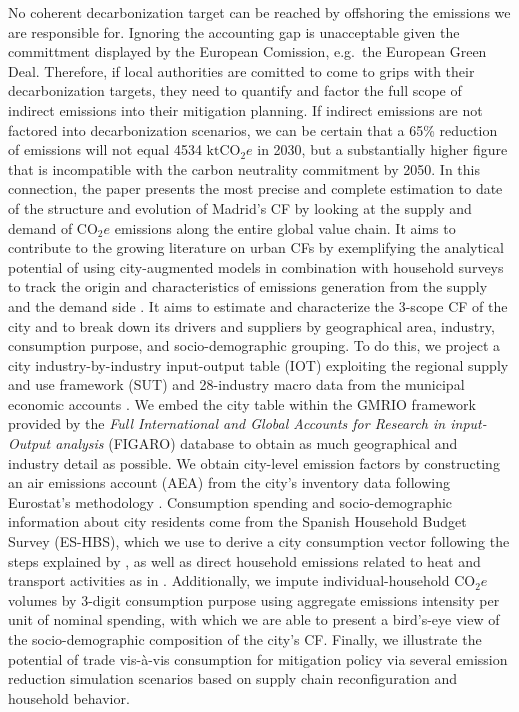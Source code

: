 \documentclass[
  10pt,
  twocolumn]{aft}
\begin{document}
No coherent decarbonization target can be reached by offshoring the
emissions we are responsible for. Ignoring the accounting gap is
unacceptable given the committment displayed by the European Comission,
e.g.~the European Green Deal. Therefore, if local authorities are
comitted to come to grips with their decarbonization targets, they need
to quantify and factor the full scope of indirect emissions into their
mitigation planning. If indirect emissions are not factored into
decarbonization scenarios, we can be certain that a 65\% reduction of
emissions will not equal 4534 \(\text{ktCO}_2e\) in 2030, but a
substantially higher figure that is incompatible with the carbon
neutrality commitment by 2050. In this connection, the paper presents
the most precise and complete estimation to date of the structure and
evolution of Madrid's CF by looking at the supply and demand of
\(\text{CO}_2e\) emissions along the entire global value chain. It aims
to contribute to the growing literature on urban CFs by exemplifying the
analytical potential of using city-augmented models in combination with
household surveys to track the origin and characteristics of emissions
generation from the supply and the demand side
\citep{wiedmann_city_2021, chen_urban_2020, moran_carbon_2018, c40_consumption-based_2018}.
It aims to estimate and characterize the 3-scope CF of the city and to
break down its drivers and suppliers by geographical area, industry,
consumption purpose, and socio-demographic grouping. To do this, we
project a city industry-by-industry input-output table (IOT) exploiting
the regional supply and use framework (SUT) and 28-industry macro data
from the municipal economic accounts \citep{am_areas_2023}. We embed the
city table within the GMRIO framework provided by the \emph{Full
International and Global Accounts for Research in input-Output analysis}
(FIGARO) database \citep{remond-tiedrez_eu_2019} to obtain as much
geographical and industry detail as possible. We obtain city-level
emission factors by constructing an air emissions account (AEA) from the
city's inventory data \citep{am_inventario_2021} following Eurostat's
methodology \citep{eurostat_manual_2015, eurostat_european_2013}.
Consumption spending and socio-demographic information about city
residents come from the Spanish Household Budget Survey (ES-HBS), which
we use to derive a city consumption vector following the steps explained
by \citet{cazcarro_linking_2022}, as well as direct household emissions
related to heat and transport activities as in
\citet{corcoles_carbon_2024}. Additionally, we impute
individual-household \(\text{CO}_2e\) volumes by 3-digit consumption
purpose using aggregate emissions intensity per unit of nominal
spending, with which we are able to present a bird's-eye view of the
socio-demographic composition of the city's CF. Finally, we illustrate
the potential of trade vis-à-vis consumption for mitigation policy via
several emission reduction simulation scenarios based on supply chain
reconfiguration and household behavior.
\end{document}
